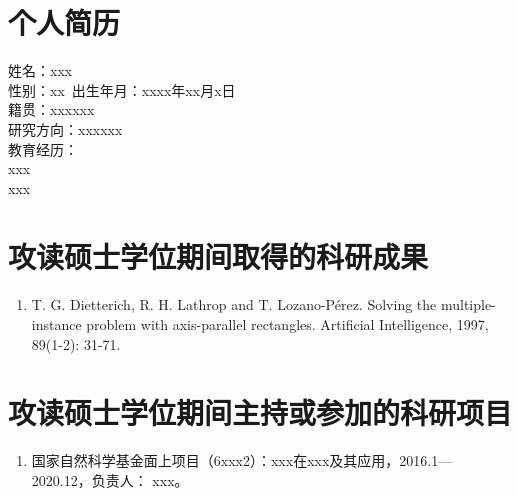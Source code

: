 \documentclass{standalone}
\begin{document}
    
\thesisresume



    
\section*{个人简历}
\noindent 姓名：xxx\\
性别：xx\
出生年月：xxxx年xx月x日\\
籍贯：xxxxxx\\
研究方向：xxxxxx\\
教育经历：\\
xxx\\
xxx

\section*{攻读硕士学位期间取得的科研成果} %
\begin{enumerate}
\renewcommand{\labelenumi}{[\theenumi]}
\item 
T. G. Dietterich, R. H. Lathrop and T. Lozano-Pérez. Solving the multiple-instance problem with axis-parallel rectangles. Artificial Intelligence, 1997, 89(1-2): 31-71.
\end{enumerate}

\section*{攻读硕士学位期间主持或参加的科研项目}
\begin{enumerate}
\renewcommand{\labelenumi}{[\theenumi]}
\item 国家自然科学基金面上项目（6xxx2）：xxx在xxx及其应用，2016.1—2020.12，负责人：
xxx。  
\end{enumerate}
\end{document}
